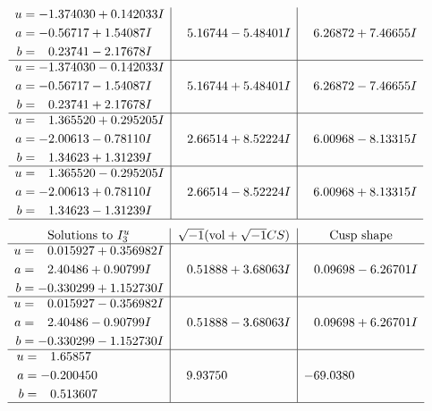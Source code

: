 \documentclass[1p]{elsarticle_modified}
\theoremstyle{definition}
\newcommand{\I}{\sqrt{-1}}
\begin{document}
$$\begin{array}{c|c|c}
\begin{aligned}
u &= -1.374030 + 0.142033 I \\
a &= -0.56717 + 1.54087 I \\
b &= \phantom{-}0.23741 - 2.17678 I\end{aligned}
 & \phantom{-}5.16744 - 5.48401 I & \phantom{-}6.26872 + 7.46655 I \\ \hline\begin{aligned}
u &= -1.374030 - 0.142033 I \\
a &= -0.56717 - 1.54087 I \\
b &= \phantom{-}0.23741 + 2.17678 I\end{aligned}
 & \phantom{-}5.16744 + 5.48401 I & \phantom{-}6.26872 - 7.46655 I \\ \hline\begin{aligned}
u &= \phantom{-}1.365520 + 0.295205 I \\
a &= -2.00613 - 0.78110 I \\
b &= \phantom{-}1.34623 + 1.31239 I\end{aligned}
 & \phantom{-}2.66514 + 8.52224 I & \phantom{-}6.00968 - 8.13315 I \\ \hline\begin{aligned}
u &= \phantom{-}1.365520 - 0.295205 I \\
a &= -2.00613 + 0.78110 I \\
b &= \phantom{-}1.34623 - 1.31239 I\end{aligned}
 & \phantom{-}2.66514 - 8.52224 I & \phantom{-}6.00968 + 8.13315 I\\
 \hline 
 \end{array}$$\newpage$$\begin{array}{c|c|c}  
\text{Solutions to }I^u_{3}& \I (\text{vol} + \sqrt{-1}CS) & \text{Cusp shape}\\
 \hline 
\begin{aligned}
u &= \phantom{-}0.015927 + 0.356982 I \\
a &= \phantom{-}2.40486 + 0.90799 I \\
b &= -0.330299 + 1.152730 I\end{aligned}
 & \phantom{-}0.51888 + 3.68063 I & \phantom{-}0.09698 - 6.26701 I \\ \hline\begin{aligned}
u &= \phantom{-}0.015927 - 0.356982 I \\
a &= \phantom{-}2.40486 - 0.90799 I \\
b &= -0.330299 - 1.152730 I\end{aligned}
 & \phantom{-}0.51888 - 3.68063 I & \phantom{-}0.09698 + 6.26701 I \\ \hline\begin{aligned}
u &= \phantom{-}1.65857\phantom{ +0.000000I} \\
a &= -0.200450\phantom{ +0.000000I} \\
b &= \phantom{-}0.513607\phantom{ +0.000000I}\end{aligned}
 & \phantom{-}9.93750\phantom{ +0.000000I} & -69.0380\phantom{ +0.000000I}\\
 \hline 
 \end{array}$$\newpage\newpage\renewcommand{\arraystretch}{1}
\end{document}
